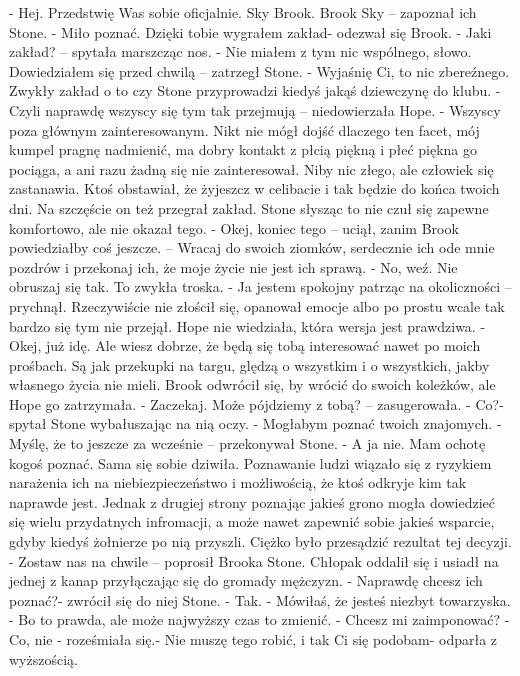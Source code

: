 \documentclass[12pt,a4paper]{book}
\begin{document}
- Hej. Przedstwię Was sobie oficjalnie. Sky Brook. Brook Sky – zapoznał ich Stone.
- Miło poznać. Dzięki tobie wygrałem zakład- odezwał się Brook.
- Jaki zakład? – spytała marszcząc nos.
- Nie miałem z tym nic wspólnego, słowo. Dowiedziałem się przed chwilą – zatrzegł Stone. 
- Wyjaśnię Ci, to nic zbereźnego. Zwykły zakład o to czy Stone przyprowadzi kiedyś jakąś dziewczynę do klubu.  
- Czyli naprawdę wszyscy się tym tak przejmują – niedowierzała Hope. 
- Wszyscy poza głównym zainteresowanym. Nikt nie mógł dojść dlaczego ten facet, mój kumpel pragnę nadmienić, ma dobry kontakt z płcią piękną i płeć piękna go pociąga, a ani razu żadną się nie zainteresował. Niby nic złego, ale człowiek się zastanawia. Ktoś obstawiał, że żyjeszcz w celibacie i tak będzie do końca twoich dni. Na szczęście on też przegrał zakład. 
Stone słysząc to nie czuł się zapewne komfortowo, ale nie okazał tego.
- Okej, koniec tego – uciął, zanim Brook powiedziałby coś jeszcze. – Wracaj do swoich ziomków, serdecznie ich ode mnie pozdrów i przekonaj ich, że moje życie nie jest ich sprawą. 
- No, weź. Nie obruszaj się tak. To zwykła troska. 
- Ja jestem spokojny patrząc na okoliczności – prychnął.
Rzeczywiście nie złościł się, opanował emocje albo po prostu wcale tak bardzo się tym nie przejął. Hope nie wiedziała, która wersja jest prawdziwa. 
- Okej, już idę. Ale wiesz dobrze, że będą się tobą interesować nawet po moich prośbach. Są jak przekupki na targu, ględzą o wszystkim i o wszystkich, jakby własnego życia nie mieli. 
Brook odwrócił się, by wrócić do swoich koleżków, ale Hope go zatrzymała. 
- Zaczekaj. Może pójdziemy z tobą? – zasugerowała. 
- Co?- spytał Stone wybałuszając na nią oczy. 
- Mogłabym poznać twoich znajomych. 
- Myślę, że to jeszcze za wcześnie – przekonywał Stone. 
- A ja nie. Mam ochotę kogoś poznać. 
Sama się sobie dziwiła. Poznawanie ludzi wiązało się z ryzykiem narażenia ich na niebiezpieczeństwo i możliwością, że ktoś odkryje kim tak naprawde jest. Jednak z drugiej strony poznając jakieś grono mogła dowiedzieć się wielu przydatnych infromacji, a może nawet zapewnić sobie jakieś wsparcie, gdyby kiedyś żołnierze po nią przyszli. Ciężko było przesądzić rezultat tej decyzji. 
- Zostaw nas na chwile – poprosił Brooka Stone. 
Chłopak oddalił się i usiadł na jednej z kanap przyłączając się do gromady mężczyzn. 
- Naprawdę chcesz ich poznać?- zwrócił się do niej Stone. 
- Tak. 
- Mówiłaś, że jesteś niezbyt towarzyska.
- Bo to prawda, ale może najwyższy czas to zmienić. 
- Chcesz mi zaimponować?
- Co, nie - roześmiała się.- Nie muszę tego robić, i tak Ci się podobam- odparła z wyższością.
\end{document}
